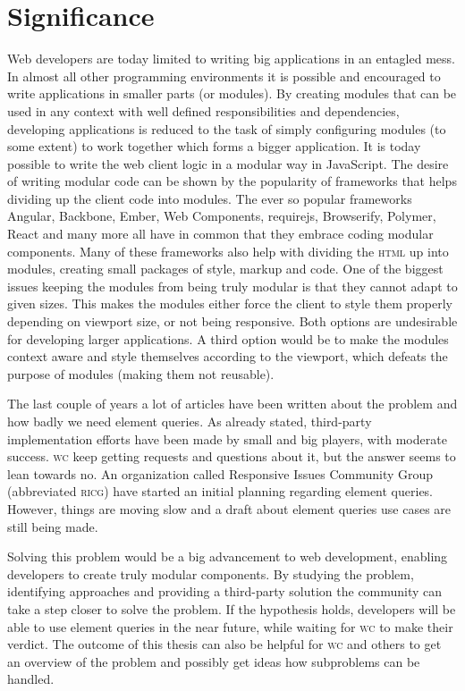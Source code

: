 \documentclass[oneside,a4paper,11pt]{kth-mag}
\begin{document}
\section*{Significance}
Web developers are today limited to writing big applications in an entagled mess. In almost all other programming environments it is possible and encouraged to write applications in smaller parts (or modules). By creating modules that can be used in any context with well defined responsibilities and dependencies, developing applications is reduced to the task of simply configuring modules (to some extent) to work together which forms a bigger application. It is today possible to write the web client logic in a modular way in JavaScript. The desire of writing modular code can be shown by the popularity of frameworks that helps dividing up the client code into modules. The ever so popular frameworks Angular, Backbone, Ember, Web Components, requirejs, Browserify, Polymer, React and many more all have in common that they embrace coding modular components. Many of these frameworks also help with dividing the \textsc{html} up into modules, creating small packages of style, markup and code. One of the biggest issues keeping the modules from being truly modular is that they cannot adapt to given sizes. This makes the modules either force the client to style them properly depending on viewport size, or not being responsive. Both options are undesirable for developing larger applications. A third option would be to make the modules context aware and style themselves according to the viewport, which defeats the purpose of modules (making them not reusable).

The last couple of years a lot of articles have been written about the problem and how badly we need element queries. As already stated, third-party implementation efforts have been made by small and big players, with moderate success. \textsc{w}\textsc{c} keep getting requests and questions about it, but the answer seems to lean towards no. An organization called Responsive Issues Community Group (abbreviated \textsc{ricg}) have started an initial planning regarding element queries. However, things are moving slow and a draft about element queries use cases are still being made.

Solving this problem would be a big advancement to web development, enabling developers to create truly modular components. By studying the problem, identifying approaches and providing a third-party solution the community can take a step closer to solve the problem. If the hypothesis holds, developers will be able to use element queries in the near future, while waiting for \textsc{w}\textsc{c} to make their verdict. The outcome of this thesis can also be helpful for \textsc{w}\textsc{c} and others to get an overview of the problem and possibly get ideas how subproblems can be handled.
\end{document}
